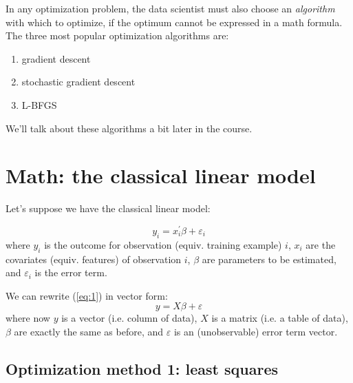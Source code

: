 \documentclass[12pt,english]{article}
\begin{document}
In any optimization problem, the data scientist must also choose an \emph{algorithm} with which to optimize, if the optimum cannot be expressed in a math formula. The three most popular optimization algorithms are:
\begin{enumerate}
    \item gradient descent
    \item stochastic gradient descent
    \item L-BFGS
\end{enumerate}
We'll talk about these algorithms a bit later in the course.

\section{Math: the classical linear model}

Let's suppose we have the classical linear model:

\begin{equation}
y_{i}=x_{i}^{\prime}\beta+\varepsilon_{i}\label{eq:1}
\end{equation}
where $y_{i}$ is the outcome for observation (equiv. training example) $i$, $x_{i}$ are the covariates (equiv. features) of observation $i$, $\beta$ are parameters to be estimated, and $\varepsilon_{i}$ is the error term.

We can rewrite (\ref{eq:1}) in vector form:
\begin{equation}
y=X\beta+\varepsilon\label{eq:2}
\end{equation}
where now $y$ is a vector (i.e. column of data), $X$ is a matrix (i.e. a table of data), $\beta$ are exactly the same as before, and $\varepsilon$ is an (unobservable) error term vector. 

\subsection{Optimization method 1: least squares}
\end{document}
